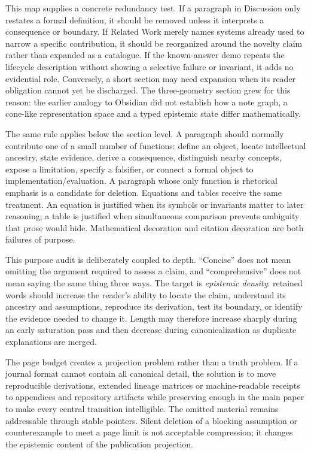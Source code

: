 This map supplies a concrete redundancy test. If a paragraph in Discussion only restates a formal definition, it should be removed unless it interprets a consequence or boundary. If Related Work merely names systems already used to narrow a specific contribution, it should be reorganized around the novelty claim rather than expanded as a catalogue. If the known-answer demo repeats the lifecycle description without showing a selective failure or invariant, it adds no evidential role. Conversely, a short section may need expansion when its reader obligation cannot yet be discharged. The three-geometry section grew for this reason: the earlier analogy to Obsidian did not establish how a note graph, a cone-like representation space and a typed epistemic state differ mathematically.

The same rule applies below the section level. A paragraph should normally contribute one of a small number of functions: define an object, locate intellectual ancestry, state evidence, derive a consequence, distinguish nearby concepts, expose a limitation, specify a falsifier, or connect a formal object to implementation/evaluation. A paragraph whose only function is rhetorical emphasis is a candidate for deletion. Equations and tables receive the same treatment. An equation is justified when its symbols or invariants matter to later reasoning; a table is justified when simultaneous comparison prevents ambiguity that prose would hide. Mathematical decoration and citation decoration are both failures of purpose.

This purpose audit is deliberately coupled to depth. ``Concise'' does not mean omitting the argument required to assess a claim, and ``comprehensive'' does not mean saying the same thing three ways. The target is \emph{epistemic density}: retained words should increase the reader's ability to locate the claim, understand its ancestry and assumptions, reproduce its derivation, test its boundary, or identify the evidence needed to change it. Length may therefore increase sharply during an early saturation pass and then decrease during canonicalization as duplicate explanations are merged.

The page budget creates a projection problem rather than a truth problem. If a journal format cannot contain all canonical detail, the solution is to move reproducible derivations, extended lineage matrices or machine-readable receipts to appendices and repository artifacts while preserving enough in the main paper to make every central transition intelligible. The omitted material remains addressable through stable pointers. Silent deletion of a blocking assumption or counterexample to meet a page limit is not acceptable compression; it changes the epistemic content of the publication projection.

